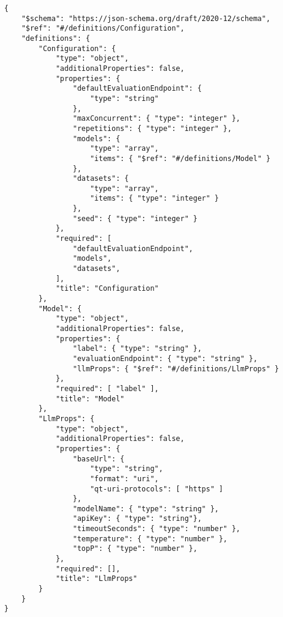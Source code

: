 \begin{lstlisting}[caption={Schema der YAML-Evaluationskonfiguration},label={lst:evaluation-config-schema}]
{
    "$schema": "https://json-schema.org/draft/2020-12/schema",
    "$ref": "#/definitions/Configuration",
    "definitions": {
        "Configuration": {
            "type": "object",
            "additionalProperties": false,
            "properties": {
                "defaultEvaluationEndpoint": {
                    "type": "string"
                },
                "maxConcurrent": { "type": "integer" },
                "repetitions": { "type": "integer" },
                "models": {
                    "type": "array",
                    "items": { "$ref": "#/definitions/Model" }
                },
                "datasets": {
                    "type": "array",
                    "items": { "type": "integer" }
                },
                "seed": { "type": "integer" }
            },
            "required": [
                "defaultEvaluationEndpoint",
                "models",
                "datasets",
            ],
            "title": "Configuration"
        },
        "Model": {
            "type": "object",
            "additionalProperties": false,
            "properties": {
                "label": { "type": "string" },
                "evaluationEndpoint": { "type": "string" },
                "llmProps": { "$ref": "#/definitions/LlmProps" }
            },
            "required": [ "label" ],
            "title": "Model"
        },
        "LlmProps": {
            "type": "object",
            "additionalProperties": false,
            "properties": {
                "baseUrl": {
                    "type": "string",
                    "format": "uri",
                    "qt-uri-protocols": [ "https" ]
                },
                "modelName": { "type": "string" },
                "apiKey": { "type": "string"},
                "timeoutSeconds": { "type": "number" },
                "temperature": { "type": "number" },
                "topP": { "type": "number" },
            },
            "required": [],
            "title": "LlmProps"
        }
    }
}
\end{lstlisting}

